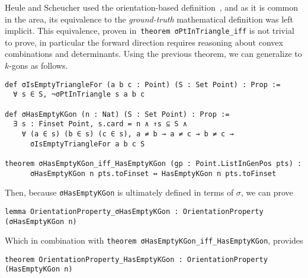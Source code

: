 



Heule and Scheucher used the orientation-based definition~\cite{emptyHexagonNumber}, and as it is common in the area, its equivalence to the \emph{ground-truth} mathematical definition was left implicit. This equivalence, proven in~\lstinline|theorem σPtInTriangle_iff| is not trivial to prove, in particular the forward direction requires reasoning about convex combinations and determinants.
Using the previous theorem, we can generalize to $k$-gons as follows.
\begin{lstlisting}
def σIsEmptyTriangleFor (a b c : Point) (S : Set Point) : Prop :=
  ∀ s ∈ S, ¬σPtInTriangle s a b c

def σHasEmptyKGon (n : Nat) (S : Set Point) : Prop :=
  ∃ s : Finset Point, s.card = n ∧ ↑s ⊆ S ∧
    ∀ (a ∈ s) (b ∈ s) (c ∈ s), a ≠ b → a ≠ c → b ≠ c →
      σIsEmptyTriangleFor a b c S

theorem σHasEmptyKGon_iff_HasEmptyKGon (gp : Point.ListInGenPos pts) :
      σHasEmptyKGon n pts.toFinset ↔ HasEmptyKGon n pts.toFinset
\end{lstlisting}

Then, because \lstinline|σHasEmptyKGon| is ultimately defined in terms of $\sigma$, we can prove
\begin{lstlisting}
lemma OrientationProperty_σHasEmptyKGon : OrientationProperty (σHasEmptyKGon n)
\end{lstlisting}
Which in combination with \lstinline|theorem σHasEmptyKGon_iff_HasEmptyKGon|, provides
\begin{lstlisting}
theorem OrientationProperty_HasEmptyKGon : OrientationProperty (HasEmptyKGon n)
\end{lstlisting}

